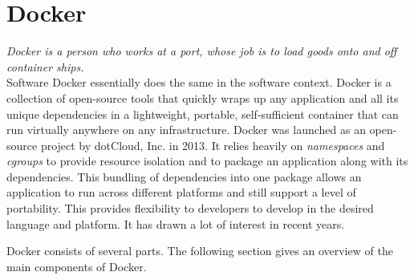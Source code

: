 	\section{Docker}
	\label{Grundlagen:Docker}
	\textit{Docker is a person who works at a port, whose job is to load goods onto and off container ships.} \cite{docker-definition-english}\\

	Software Docker essentially does the same in the software context. Docker is a collection of open-source tools that quickly wraps up any application and all its unique dependencies in a lightweight, portable, self-sufficient container that can run virtually anywhere on any infrastructure.\cite{docker-definition}
	Docker was launched as an open-source project by dotCloud, Inc. in
	2013. It relies heavily on \textit{namespaces} and \textit{cgroups} to provide resource isolation and to package an application along with its dependencies. This bundling of dependencies into one package allows an application to run across different platforms and still support a level of portability. This provides flexibility to developers to develop in the desired language and platform. It has drawn a lot of interest in recent years.\cite[P.~10]{Kinnary2018}

	Docker consists of several parts. The following section gives an overview of the main components of Docker.


